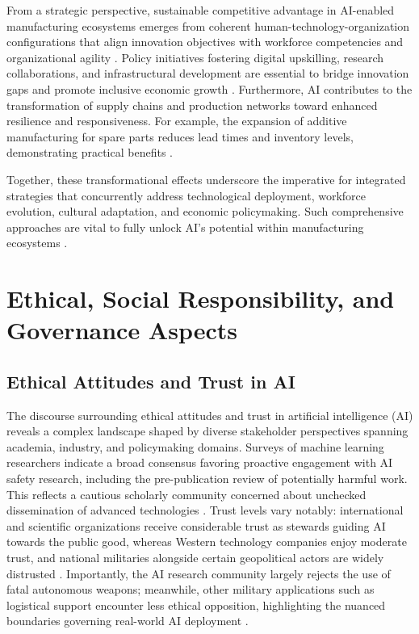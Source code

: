 \documentclass[sigconf]{acmart}
\begin{document}
From a strategic perspective, sustainable competitive advantage in AI-enabled manufacturing ecosystems emerges from coherent human-technology-organization configurations that align innovation objectives with workforce competencies and organizational agility \cite{ref36}. Policy initiatives fostering digital upskilling, research collaborations, and infrastructural development are essential to bridge innovation gaps and promote inclusive economic growth \cite{ref38}. Furthermore, AI contributes to the transformation of supply chains and production networks toward enhanced resilience and responsiveness. For example, the expansion of additive manufacturing for spare parts reduces lead times and inventory levels, demonstrating practical benefits \cite{ref9}.

Together, these transformational effects underscore the imperative for integrated strategies that concurrently address technological deployment, workforce evolution, cultural adaptation, and economic policymaking. Such comprehensive approaches are vital to fully unlock AI’s potential within manufacturing ecosystems \cite{ref19}.

\section{Ethical, Social Responsibility, and Governance Aspects}

\subsection{Ethical Attitudes and Trust in AI}

The discourse surrounding ethical attitudes and trust in artificial intelligence (AI) reveals a complex landscape shaped by diverse stakeholder perspectives spanning academia, industry, and policymaking domains. Surveys of machine learning researchers indicate a broad consensus favoring proactive engagement with AI safety research, including the pre-publication review of potentially harmful work. This reflects a cautious scholarly community concerned about unchecked dissemination of advanced technologies \cite{ref9}. Trust levels vary notably: international and scientific organizations receive considerable trust as stewards guiding AI towards the public good, whereas Western technology companies enjoy moderate trust, and national militaries alongside certain geopolitical actors are widely distrusted \cite{ref9}. Importantly, the AI research community largely rejects the use of fatal autonomous weapons; meanwhile, other military applications such as logistical support encounter less ethical opposition, highlighting the nuanced boundaries governing real-world AI deployment \cite{ref9}.
\end{document}
